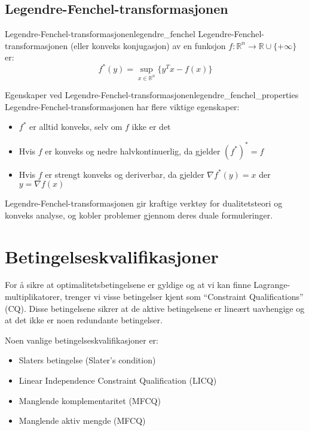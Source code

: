 \subsection{Legendre-Fenchel-transformasjonen}

\begin{definition}{Legendre-Fenchel-transformasjonen}{legendre_fenchel}
	Legendre-Fenchel-transformasjonen (eller konveks konjugasjon) av en funksjon \( f: \mathbb{R}^n \to \mathbb{R} \cup \{+\infty\} \) er:
	\[
		f^*(y) = \sup_{x \in \mathbb{R}^n} \{y^Tx - f(x)\}
	\]
\end{definition}

\begin{theorem}{Egenskaper ved Legendre-Fenchel-transformasjonen}{legendre_fenchel_properties}
	Legendre-Fenchel-transformasjonen har flere viktige egenskaper:
	\begin{itemize}
		\item \( f^* \) er alltid konveks, selv om \( f \) ikke er det
		\item Hvis \( f \) er konveks og nedre halvkontinuerlig, da gjelder \( (f^*)^* = f \)
		\item Hvis \( f \) er strengt konveks og deriverbar, da gjelder \( \nabla f^*(y) = x \) der \( y = \nabla f(x) \)
	\end{itemize}
\end{theorem}

Legendre-Fenchel-transformasjonen gir kraftige verktøy for dualitetsteori og konveks analyse, og kobler problemer gjennom deres duale formuleringer.

\section{Betingelseskvalifikasjoner}

For å sikre at optimalitetsbetingelsene er gyldige og at vi kan finne Lagrange-multiplikatorer, trenger vi visse betingelser kjent som \enquote{Constraint Qualifications} (CQ).
Disse betingelsene sikrer at de aktive betingelsene er lineært uavhengige og at det ikke er noen redundante betingelser.

Noen vanlige betingelseskvalifikasjoner er:
\begin{itemize}
	\item Slaters betingelse (Slater's condition)
	\item Linear Independence Constraint Qualification (LICQ)
	\item Manglende komplementaritet (MFCQ)
	\item Manglende aktiv mengde (MFCQ)
\end{itemize}

